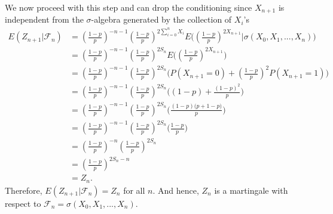 \documentclass[10pt]{amsart}
\begin{document}
We now proceed with this step and can drop the conditioning since $X_{n + 1}$ is independent from the $\sigma$-algebra generated by the collection of $X_i$'s
\begin{align*}
E (Z_{n + 1} | \mathcal F_n) &= \left(\frac{1-p}{p} \right)^{- n - 1} \left(\frac{1-p}{p} \right)^{2\sum_{i=0}^{n} X_i} E \Bigg(\left(\frac{1-p}{p} \right)^{2X_{n + 1}} \Bigg| \sigma(X_0, X_1, ...,  X_n)\Bigg) \\
	&= \left(\frac{1-p}{p} \right)^{- n - 1} \left(\frac{1-p}{p} \right)^{2S_n} E \Bigg(\left(\frac{1-p}{p} \right)^{2X_{n + 1}}\Bigg) \\
	&= \left(\frac{1-p}{p} \right)^{- n - 1} \left(\frac{1-p}{p} \right)^{2S_n} \Bigg(P(X_{n + 1} = 0)  + \left(\frac{1-p}{p} \right)^2P(X_{n + 1} = 1)\Bigg) \\
	&= \left(\frac{1-p}{p} \right)^{- n - 1} \left(\frac{1-p}{p} \right)^{2S_n} \Bigg((1 - p)  + \frac{(1-p)^2}{p}\Bigg) \\
	&= \left(\frac{1-p}{p} \right)^{- n - 1} \left(\frac{1-p}{p} \right)^{2S_n} \Bigg(\frac{(1 - p)\big(p + 1 - p\big)}{p}\Bigg) \\
	&= \left(\frac{1-p}{p} \right)^{- n - 1} \left(\frac{1-p}{p} \right)^{2S_n} \Bigg(\frac{1 - p}{p} \Bigg) \\
	&= \left(\frac{1-p}{p} \right)^{- n} \left(\frac{1-p}{p} \right)^{2S_n} \\
	&=\left(\frac{1-p}{p} \right)^{2S_n - n} \\
	&= Z_n.
\end{align*}
Therefore, $E (Z_{n + 1} | \mathcal F_n)  = Z_n$ for all $n$.
And hence, $Z_n$ is a martingale with respect to $\mathcal{F}_n = \sigma(X_0, X_1, . . . , X_n )$.


\newpage
\end{document}
